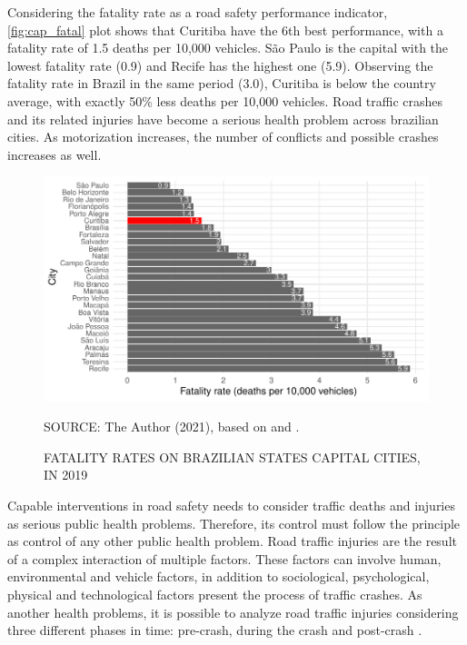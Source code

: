 Considering the fatality rate as a road safety performance indicator, \autoref{fig:cap_fatal} plot shows that Curitiba have the 6th best performance, with a fatality rate of 1.5 deaths per 10,000 vehicles. São Paulo is the capital with the lowest fatality rate (0.9) and Recife has the highest one (5.9). Observing the fatality rate in Brazil in the same period (3.0), Curitiba is below the country average, with exactly 50\% less deaths per 10,000 vehicles. Road traffic crashes and its related injuries have become a serious health problem across brazilian cities. As motorization increases, the number of conflicts and possible crashes increases as well.

\begin{figure}[!htbp]
    \centering\footnotesize
    \captionsetup{font=footnotesize}
    \caption{FATALITY RATES ON BRAZILIAN STATES CAPITAL CITIES, IN 2019}
    \includegraphics{fig/cap_fatal.pdf}
    \label{fig:cap_fatal}
    \par SOURCE: The Author (2021), based on \textcite{MinistryofHealth2020} and \textcite{DENATRAN2020}.
\end{figure} 






Capable interventions in road safety needs to consider traffic deaths and injuries as serious public health problems. Therefore, its control must follow the principle as control of any other public health problem. Road traffic injuries are the result of a complex interaction of multiple factors. These factors can involve human, environmental and vehicle factors, in addition to sociological, psychological, physical and technological factors present the process of traffic crashes. As another health problems, it is possible to analyze road traffic injuries considering three different phases in time: pre-crash, during the crash and post-crash \cite{Mohan2016}. 

